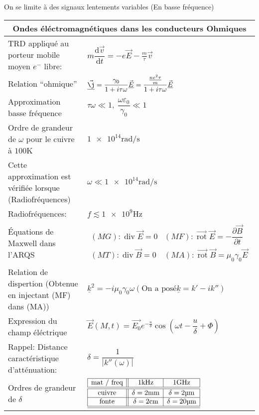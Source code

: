 \documentclass[10pt,a4paper,titlepage,landscape]{article}
\renewcommand{\d}
{
    \mathrm{d}
}
\newcommand*{\dv}[2]
{
    \dfrac{\d#1}{\d#2}
}
\newcommand*{\dpv}[2]
{
    \dfrac{\partial#1}{\partial#2}
}
\newcommand{\rot}
{
    \vec{\operatorname{rot}}
}
\renewcommand{\div}
{
    \operatorname{div}
}
\renewcommand{\arraystretch}{2}
\begin{document}
On se limite à des signaux lentements variables (En basse fréquence)

\begin{table}[H]
    \centering
    \renewcommand{\arraystretch}{1.5} %
    \setlength{\tabcolsep}{8pt} %
    \begin{tabular}{@{}|p{9cm}|p{10cm}@{}|}

        \multicolumn{2}{c}{\textbf{Ondes éléctromagnétiques dans les conducteurs Ohmiques}} \\ \hline

        TRD appliqué au porteur mobile moyen $e^-$ libre: & $m\dv{\vec{v}}{t} = -e\vec{E} - \frac{m}{\tau}\vec{v}$ \\ \hline
        Relation ``ohmique'' & $\vec{\underline{\j}} =\dfrac{\gamma_0}{1+i\tau\omega}\vec{\underline{E}} = \dfrac{\frac{ne^2\tau}{m}}{1+i\tau\omega}\vec{\underline{E}}$ \\ \hline
        Approximation basse fréquence & $\tau\omega \ll 1, \ \dfrac{\omega\varepsilon_0}{\gamma_0}\ll1$ \\ \hline 
        Ordre de grandeur de $\omega$ pour le cuivre à $\num{100} \unit{\kelvin}$ & $\num{1e14} \unit{\radian\per\second}$ \\ \hline
        Cette approximation est vérifiée lorsque (Radiofréquences) & $\omega \ll \num{1e14}\unit{\radian\per\second}$ \\ \hline
        Radiofréquences: & $f \lesssim \num{1e9}\unit{\Hz}$ \\ \hline
        Équations de Maxwell dans l'ARQS & $\begin{matrix}(MG): \div \vec{E} = 0 & (MF): \rot\vec{E} = -\dpv{\vec{B}}{t} \\ \hline (MT): \div \vec{B} = 0 & (MA): \rot \vec{B} = \mu_0\gamma_0\vec{E}\end{matrix}$ \\ \hline
        Relation de dispertion (Obtenue en injectant (MF) dans (MA))& $\underline{k}^2 = -i\mu_0\gamma_0\omega (\text{On a posé} \underline{k} = k'-ik'')$ \\ \hline
        Expression du champ éléctrique & $\vec{E}(M,t )=\vec{E_0}e^{-\frac{u}{\delta}}\cos\left(\omega t - \dfrac{u}{\delta} + \Phi\right)$ \\ \hline
        Rappel: Distance caractéristique d'atténuation: & $\delta = \dfrac{1}{|k''(\omega)|}$ \\ \hline 
        Ordres de grandeur de $\delta$ & $\begin{array}{|c||c|c|} \hline \text{mat / freq} & \num{1}\unit{\kHz} & \num{1}\unit{\GHz} \\ \hline \hline \text{cuivre} & \delta = \num{2}\unit{\mm} & \delta = \num{2}\unit{\micro\meter} \\ \hline \text{fonte} & \delta =  \num{2}\unit{\cm} & \delta = \num{20}\unit{\micro\meter} \\ \hline \hline \end{array}$ \\ \hline 

\end{tabular}
\end{table}
\end{document}
